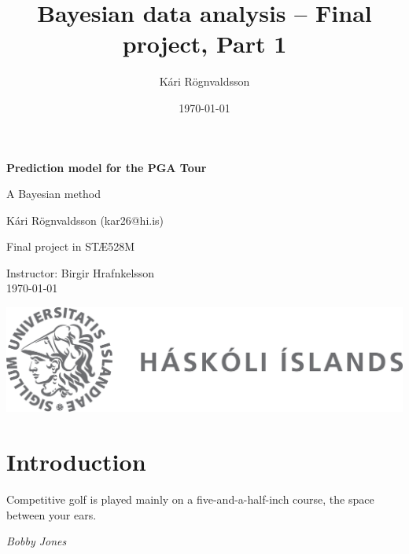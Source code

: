\documentclass{article}\usepackage[]{graphicx}\usepackage[]{color}
\title{Bayesian data analysis – Final project, Part 1}
\author{Kári Rögnvaldsson}
\date{\today}
\begin{document}


\begin{titlepage}
    \begin{center}
        \vspace*{4cm}
            
        \Huge
        \textbf{Prediction model for the PGA Tour}
            
        \vspace{0.5cm}
        \Large
        A Bayesian method
            
        \vspace{1.5cm}
            
        \large
        Kári Rögnvaldsson (kar26@hi.is) \\
            
        \vfill
            
        Final project in STÆ528M
            
        \vspace{0.8cm}
            
        \large
        Instructor: Birgir Hrafnkelsson \\
        \today
            
        \vspace{1cm}
        \includegraphics[scale=0.4]{front_page/hi_logo.png}
    \end{center}
\end{titlepage}

\newpage

\section{Introduction}
\epigraph{Competitive golf is played mainly on a five-and-a-half-inch course, the space between your ears.}{\textit{Bobby Jones}}
\end{document}
